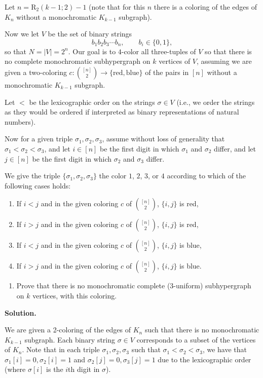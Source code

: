 \documentclass[11pt,letterpaper]{article}
\theoremstyle{definition}
\newcommand{\solution}{\medskip\noindent\textbf{Solution.}\par\medskip}
\begin{document}
Let $n = \mathrm{R}_2(k-1;2)-1$ (note that for this $n$ there is a coloring of the edges of $K_n$ without a monochromatic $K_{k-1}$ subgraph).

Now we let $V$ be the set of binary strings
\[
b_1b_2b_3\cdots b_n, \qquad b_i\in\{0,1\},
\]
so that $N = |V| = 2^n$. Our goal is to $4$-color all three-tuples of $V$ so that there is no complete monochromatic subhypergraph on $k$ vertices of $V$, assuming we are given a two-coloring $c:\binom{[n]}{2}\to\{\text{red},\text{blue}\}$ of the pairs in $[n]$ without a monochromatic $K_{k-1}$ subgraph.

Let $<$ be the lexicographic order on the strings $\sigma\in V$ (i.e., we order the strings as they would be ordered if interpreted as binary representations of natural numbers).

Now for a given triple $\sigma_1,\sigma_2,\sigma_3$, assume without loss of generality that $\sigma_1<\sigma_2<\sigma_3$, and let $i\in[n]$ be the first digit in which $\sigma_1$ and $\sigma_2$ differ, and let $j\in[n]$ be the first digit in which $\sigma_2$ and $\sigma_3$ differ.

We give the triple $\{\sigma_1,\sigma_2,\sigma_3\}$ the color $1$, $2$, $3$, or $4$ according to which of the following cases holds:
\begin{enumerate}[label=\arabic*.]
\item If $i<j$ and in the given coloring $c$ of $\binom{[n]}{2}$, $\{i,j\}$ is red,
\item If $i>j$ and in the given coloring $c$ of $\binom{[n]}{2}$, $\{i,j\}$ is red,
\item If $i<j$ and in the given coloring $c$ of $\binom{[n]}{2}$, $\{i,j\}$ is blue,
\item If $i>j$ and in the given coloring $c$ of $\binom{[n]}{2}$, $\{i,j\}$ is blue.
\end{enumerate}

\begin{enumerate}[resume=q]
\item Prove that there is no monochromatic complete ($3$-uniform) subhypergraph on $k$ vertices, with this coloring.
\end{enumerate}

\solution

We are given a 2-coloring of the edges of $K_n$ such that there is no monochromatic $K_{k-1}$ subgraph.
Each binary string $\sigma\in V$ corresponds to a subset of the vertices of $K_n$.
Note that in each triple $\sigma_1,\sigma_2,\sigma_3$ such that $\sigma_1 < \sigma_2<\sigma_3$, we have that $\sigma_1[i]=0,\sigma_2[i]=1$ and $\sigma_2[j]=0,\sigma_3[j]=1$ due to the lexicographic order (where $\sigma[i]$ is the $i$th digit in $\sigma$).
\end{document}
